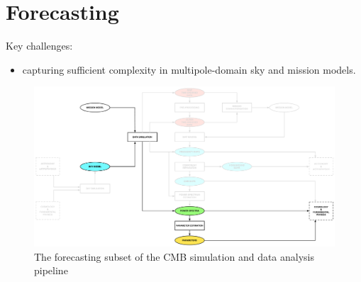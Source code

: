 
\section{Forecasting}

Key challenges: 
\begin{itemize}
\item capturing sufficient complexity in multipole-domain sky and mission models.
\end{itemize}

\begin{figure}[htbp]
\centering
\includegraphics[width=1\textwidth]{Analysis/fc}
\caption{The forecasting subset of the CMB simulation and data analysis pipeline}
\label{default}

\end{figure}
